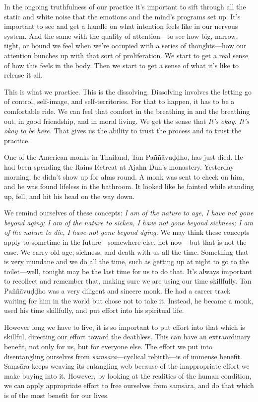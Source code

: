 In the ongoing truthfulness of our practice it's important to sift 
through all the static and white noise that the emotions and the mind's 
programs set up. It's important to see and get a handle on what 
intention feels like in our nervous system. And the same with the 
quality of attention---to see how big, narrow, tight, or bound we feel 
when we're occupied with a series of thoughts---how our attention 
bunches up with that sort of proliferation. We start to get a real 
sense of how this feels in the body. Then we start to get a sense of 
what it's like to release it all.

This is what we practice. This is the dissolving. Dissolving involves 
the letting go of control, self-image, and self-territories. For that 
to happen, it has to be a comfortable ride. We can feel that comfort in 
the breathing in and the breathing out, in good friendship, and in 
moral living. We get the sense that \emph{It's okay. It's okay to be 
here.} That gives us the ability to trust the process and to trust the 
practice.


One of the American monks in Thailand, Tan Paññāvuḍḍho, has just 
died. He had been spending the Rains Retreat at Ajahn Dun's monastery. 
Yesterday morning, he didn't show up for alms round. A monk was sent to 
check on him, and he was found lifeless in the bathroom. It looked like 
he fainted while standing up, fell, and hit his head on the way down.

We remind ourselves of these concepts: \emph{I am of the nature to age, 
I have not gone beyond aging; I am of the nature to sicken, I have not 
gone beyond sickness; I am of the nature to die, I have not gone beyond 
dying.} We may think these concepts apply to sometime in the 
future---somewhere else, not now---but that is not the case. We carry 
old age, sickness, and death with us all the time. Something that is 
very mundane and we do all the time, such as getting up at night to go 
to the toilet---well, tonight may be the last time for us to do that. 
It's always important to recollect and remember that, making sure we 
are using our time skillfully. Tan Paññāvuḍḍho was a very 
diligent and sincere monk. He had a career track waiting for him in the 
world but chose not to take it. Instead, he became a monk, used his 
time skillfully, and put effort into his spiritual life.

However long we have to live, it is so important to put effort into 
that which is skillful, directing our effort toward the deathless. This 
can have an extraordinary benefit, not only for us, but for everyone 
else. The effort we put into disentangling ourselves from 
\emph{saṃsāra}---cyclical rebirth---is of immense benefit. 
Saṃsāra keeps weaving its entangling web because of the 
inappropriate effort we make buying into it. However, by looking at the 
realities of the human condition, we can apply appropriate effort to 
free ourselves from saṃsāra, and do that which is of the most 
benefit for our lives.

